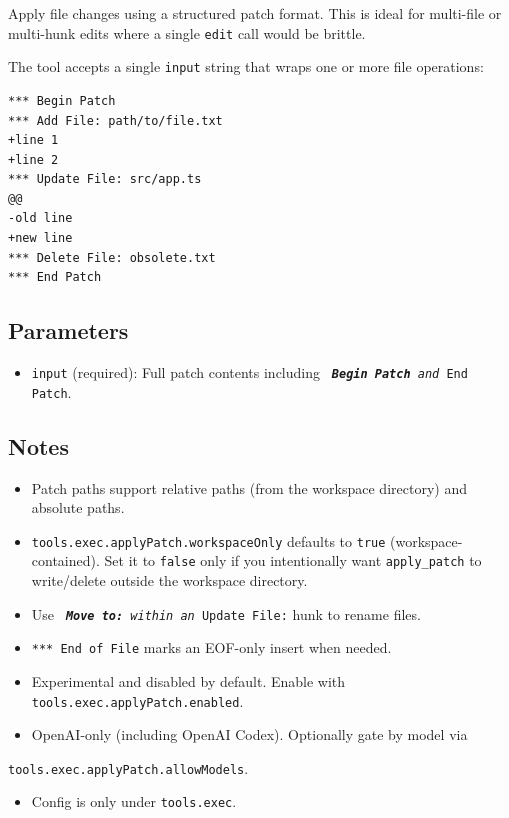 Apply file changes using a structured patch format. This is ideal for multi-file
or multi-hunk edits where a single \texttt{edit} call would be brittle.

The tool accepts a single \texttt{input} string that wraps one or more file operations:

\begin{lstlisting}
*** Begin Patch
*** Add File: path/to/file.txt
+line 1
+line 2
*** Update File: src/app.ts
@@
-old line
+new line
*** Delete File: obsolete.txt
*** End Patch
\end{lstlisting}


\subsection{Parameters}


\begin{itemize}
  \item \texttt{input} (required): Full patch contents including \texttt{\textit{\textbf{ Begin Patch} and \texttt{}} End Patch}.
\end{itemize}


\subsection{Notes}


\begin{itemize}
  \item Patch paths support relative paths (from the workspace directory) and absolute paths.
  \item \texttt{tools.exec.applyPatch.workspaceOnly} defaults to \texttt{true} (workspace-contained). Set it to \texttt{false} only if you intentionally want \texttt{apply\_patch} to write/delete outside the workspace directory.
  \item Use \texttt{\textit{\textbf{ Move to:} within an \texttt{}} Update File:} hunk to rename files.
  \item \texttt{*** End of File} marks an EOF-only insert when needed.
  \item Experimental and disabled by default. Enable with \texttt{tools.exec.applyPatch.enabled}.
  \item OpenAI-only (including OpenAI Codex). Optionally gate by model via
\end{itemize}

\texttt{tools.exec.applyPatch.allowModels}.
\begin{itemize}
  \item Config is only under \texttt{tools.exec}.
\end{itemize}


